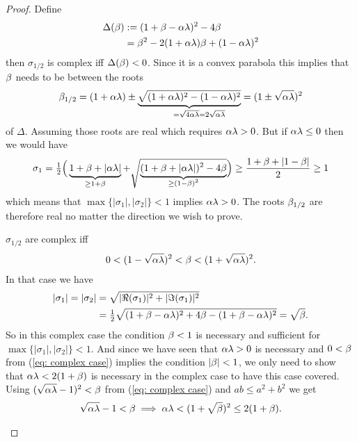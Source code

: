 \begin{proof}
	Define
	\begin{align*}
		\Delta(\beta)
		&:= (1+\beta-\alpha\lambda)^2 - 4\beta\\
		&= \beta^2 - 2(1+\alpha\lambda)\beta + (1-\alpha\lambda)^2
	\end{align*}
	then \(\sigma_{1/2}\) is complex iff \(\Delta(\beta)<0\). Since it is a
	convex parabola this implies that \(\beta\) needs to be between the roots
	\begin{align*}
		\momCoeff_{1/2}
		= (1+\lrSq\hesseEV) \pm 
		\underbrace{
			\sqrt{(1+\lrSq\hesseEV)^2 - (1-\lrSq\hesseEV)^2}
		}_{=\sqrt{4\lrSq\hesseEV}=\mathrlap{2\sqrt{\lrSq\hesseEV}}}
		= (1\pm \sqrt{\lrSq\hesseEV})^2	
	\end{align*}
	of \(\Delta\). Assuming those roots are real which requires \(\alpha\lambda>0\).
	But if \(\alpha\lambda\le0\) then we would have
	\begin{align*}
		\sigma_1
		= \tfrac12 \Big(
			\underbrace{1+\beta+|\alpha\lambda|}_{\ge 1+\beta}
			+ \sqrt{\underbrace{(1+\beta+|\alpha\lambda|)^2 - 4\beta}_{\smash{\ge (1-\beta)^2}}}
		\Big)
		\ge \frac{1+\beta + |1-\beta|}2 \ge 1
	\end{align*}
	which means that \(\max\{|\sigma_1|,|\sigma_2|\}<1\) implies \(\alpha\lambda>0\).
	The roots \(\beta_{1/2}\) are therefore real no matter the direction we
	wish to prove.
	\begin{description}[wide, labelindent=0pt]
	\item[Complex Case:]
		\(\sigma_{1/2}\) are complex iff	
		\begin{align}\label{eq: complex case}
			0 < (1-\sqrt{\alpha\lambda})^2 < \beta < (1+\sqrt{\alpha\lambda})^2.
		\end{align}
		In that case we have
		\begin{align*}
			|\sigma_1| = |\sigma_2|
			&= \sqrt{|\Re(\sigma_1)|^2 + |\Im(\sigma_1)|^2}\\
			&= \tfrac12 \sqrt{(1+\beta-\alpha\lambda)^2 + 4\beta - (1+\beta-\alpha\lambda)^2}
			= \sqrt{\beta}.
		\end{align*}
		So in this complex case the condition
		\(\beta<1\) is necessary and sufficient for \(\max\{|\sigma_1|,|\sigma_2|\}<1\).
		And since we have seen that \(\alpha\lambda>0\) is necessary and \(0<\beta\)
		from (\ref{eq: complex case}) implies the condition \(|\beta|<1\), we only
		need to show that \(\alpha\lambda <2(1+\beta)\) is necessary in the complex
		case to have this case covered. Using \((\sqrt{\alpha\lambda}-1)^2 < \beta\)
		from (\ref{eq: complex case}) and \(ab \le a^2 + b^2\) we get
		\begin{align*}
			\sqrt{\alpha\lambda} - 1
			< \beta \implies \alpha\lambda < (1+\sqrt{\beta})^2
			\le 2(1+\beta).
		\end{align*}


\end{description}
\end{proof}
